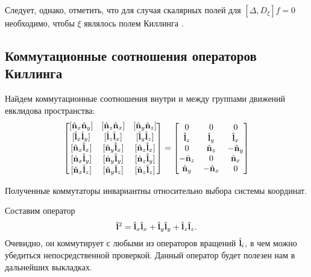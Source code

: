 \documentclass[12pt,a4paper]{article}
\begin{document}
            Следует, однако, отметить, что для случая скалярных полей для $[\Delta, D_\xi] f = 0$ необходимо, чтобы $\xi$ являлось полем Киллинга \cite{differential_operator_commutators}.


    \subsection{Коммутационные соотношения операторов Киллинга}

        Найдем коммутационные соотношения внутри и между группами движений евклидова пространства:
        \begin{equation}
            \begin{bmatrix}
                [ \Op{n}_x \Op{n}_y ] & [ \Op{n}_z \Op{n}_x ] & [ \Op{n}_y \Op{n}_z ] \\
                [ \Op{l}_x \Op{l}_y ] & [ \Op{l}_z \Op{l}_x ] & [ \Op{l}_y \Op{l}_z ] \\
                [ \Op{n}_x \Op{l}_x ] & [ \Op{n}_y \Op{l}_x ] & [ \Op{n}_z \Op{l}_x ] \\
                [ \Op{n}_x \Op{l}_y ] & [ \Op{n}_y \Op{l}_y ] & [ \Op{n}_z \Op{l}_y ] \\
                [ \Op{n}_x \Op{l}_z ] & [ \Op{n}_y \Op{l}_z ] & [ \Op{n}_z \Op{l}_z ]
            \end{bmatrix}
            =
            \begin{bmatrix}
                0          &   0        &   0        \\
                  \Op{l}_z &   \Op{l}_y &   \Op{l}_x \\
                0          &   \Op{n}_z & - \Op{n}_y \\
                - \Op{n}_z &   0        &   \Op{n}_x \\
                  \Op{n}_y & - \Op{n}_x &   0
            \end{bmatrix}
        \end{equation}

        Полученные коммутаторы инвариантны относительно выбора системы координат.

        Составим оператор
        \begin{equation}
            \hat{\mathbf{l}}^2 = \hat{\mathbf{l}}_x \hat{\mathbf{l}}_x + \hat{\mathbf{l}}_y \hat{\mathbf{l}}_y + \hat{\mathbf{l}}_z \hat{\mathbf{l}}_z .
        \end{equation}
        Очевидно, он коммутирует с любыми из операторов вращений $\hat{\mathbf{l}}_i$, в чем можно убедиться непосредственной проверкой. Данный оператор будет полезен нам в дальнейших выкладках.
\end{document}
